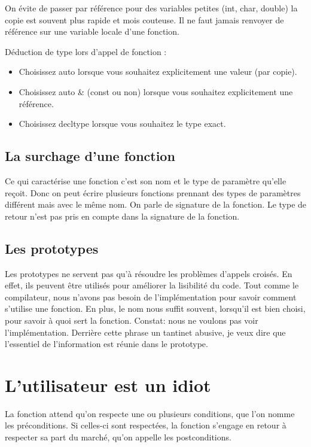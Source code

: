 \documentclass{article}
\begin{document}
On évite de passer par référence pour des variables petites (int, char, double) la copie est souvent plus rapide et mois couteuse. 
Il ne faut jamais renvoyer de référence sur une variable locale d'une fonction.

Déduction de type lors d'appel de fonction :
\begin{itemize}
    \item Choisissez auto lorsque vous souhaitez explicitement une valeur (par copie).
    \item Choisissez auto & (const ou non) lorsque vous souhaitez explicitement une référence.
    \item Choisissez decltype lorsque vous souhaitez le type exact.

\end{itemize}{}


\subsection{La surchage d'une fonction}
Ce qui caractérise une fonction c'est son nom et le type de paramètre qu'elle reçoit. Donc on peut écrire plusieurs fonctions prennant des types de paramètres différent mais avec le même nom. On parle de signature de la fonction. Le type de retour n'est pas pris en compte dans la signature de la fonction.

\subsection{Les prototypes}
Les prototypes ne servent pas qu’à résoudre les problèmes d’appels croisés. En effet, ils peuvent être utilisés pour améliorer la lisibilité du code. Tout comme le compilateur, nous n’avons pas besoin de l’implémentation pour savoir comment s’utilise une fonction. En plus, le nom nous suffit souvent, lorsqu’il est bien choisi, pour savoir à quoi sert la fonction.
Constat: nous ne voulons pas voir l’implémentation. Derrière cette phrase un tantinet abusive, je veux dire que l’essentiel de l’information est réunie dans le prototype.

\section{L'utilisateur est un idiot}
La fonction attend qu’on respecte une ou plusieurs conditions, que l’on nomme les préconditions. Si celles-ci sont respectées, la fonction s’engage en retour à respecter sa part du marché, qu’on appelle les postconditions. 
\end{document}
